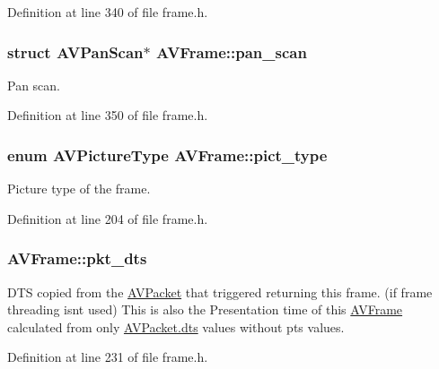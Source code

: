 Definition at line 340 of file frame.\+h.

\subsubsection[{\texorpdfstring{pan\+\_\+scan}{pan_scan}}]{ struct {\bf A\+V\+Pan\+Scan}$\ast$ A\+V\+Frame\+::pan\+\_\+scan}\hypertarget{struct_a_v_frame_a51deb6d33804b3ca22e65e45b2782902}{}\label{struct_a_v_frame_a51deb6d33804b3ca22e65e45b2782902}
Pan scan. 

Definition at line 350 of file frame.\+h.

\subsubsection[{\texorpdfstring{pict\+\_\+type}{pict_type}}]{\setlength{\rightskip}{0pt plus 5cm}enum {\bf A\+V\+Picture\+Type} A\+V\+Frame\+::pict\+\_\+type}\hypertarget{struct_a_v_frame_af9920fc3fbfa347b8943ae461b50d18b}{}\label{struct_a_v_frame_af9920fc3fbfa347b8943ae461b50d18b}
Picture type of the frame. 

Definition at line 204 of file frame.\+h.

\subsubsection[{\texorpdfstring{pkt\+\_\+dts}{pkt_dts}}]{ A\+V\+Frame\+::pkt\+\_\+dts}\hypertarget{struct_a_v_frame_aa52951f35ec9e303d3dfeb4b3e44248a}{}\label{struct_a_v_frame_aa52951f35ec9e303d3dfeb4b3e44248a}
D\+TS copied from the \hyperlink{struct_a_v_packet}{A\+V\+Packet} that triggered returning this frame. (if frame threading isnt used) This is also the Presentation time of this \hyperlink{struct_a_v_frame}{A\+V\+Frame} calculated from only \hyperlink{struct_a_v_packet_a85dbbd306b44b02390cd91c45e6a0f76}{A\+V\+Packet.\+dts} values without pts values. 

Definition at line 231 of file frame.\+h.

